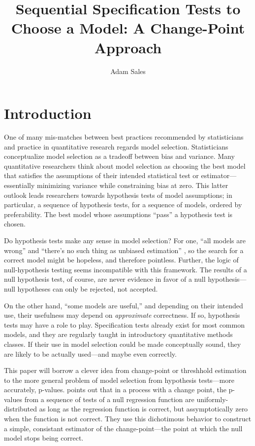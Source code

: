 \documentclass[12pt]{article}\usepackage[]{graphicx}\usepackage[]{color}
\title{Sequential Specification Tests to Choose a Model: A
  Change-Point Approach}
\author{Adam Sales}
\begin{document}
\maketitle

\section{Introduction}

One of many mis-matches between best practices recommended by
statisticians and practice in quantitative research regards model
selection.
Statisticians conceptualize model selection as a tradeoff between bias
and variance.
Many quantitative researchers think about model selection as choosing
the best model that satisfies the assumptions of their intended
statistical test or estimator---essentially minimizing variance while
constraining bias at zero.
This latter outlook leads researchers towards hypothesis tests of
model assumptions; in particular, a sequence of hypothesis tests, for
a sequence of models, ordered by preferability.
The best model whose assumptions ``pass'' a hypothesis test is chosen.

Do hypothesis tests make any sense in model selection?
For one, ``all models are wrong''
\citep[p. 2]{modelsWrong} and ``there's no such thing as unbiased
estimation'' \citep{gelmanBlogUnbiased}, so the search for a correct
model might be hopeless, and therefore pointless.
Further, the logic of null-hypothesis testing seems incompatible
with this framework.
The results of a null hypothesis test, of course, are never evidence
in favor of a null hypothesis---null hypotheses can only be rejected,
not accepted.

On the other hand, ``some models are useful,'' and depending on their
intended use, their usefulness may depend on \emph{approximate}
correctness.
If so, hypothesis tests may have a role to play.
Specification tests already exist for most common models, and
they are regularly taught in introductory quantitative methods
classes.
If their use in model selection could be made conceptually sound, they
are likely to be actually used---and maybe even correctly.

This paper will borrow a clever idea from change-point or threshhold
estimation to the more general problem of model selection from
hypothesis tests---more accurately, p-values.
\citet*{mallik} points out that in a process with a change point,
the p-values from a sequence of tests of a null regression function
are uniformly-distributed as long as the regression function is
correct, but assymptotically zero when the function is not correct.
They use this dichotimous behavior to construct a simple, consistant
estimator of the change-point---the point at which the null model
stops being correct.
\end{document}

